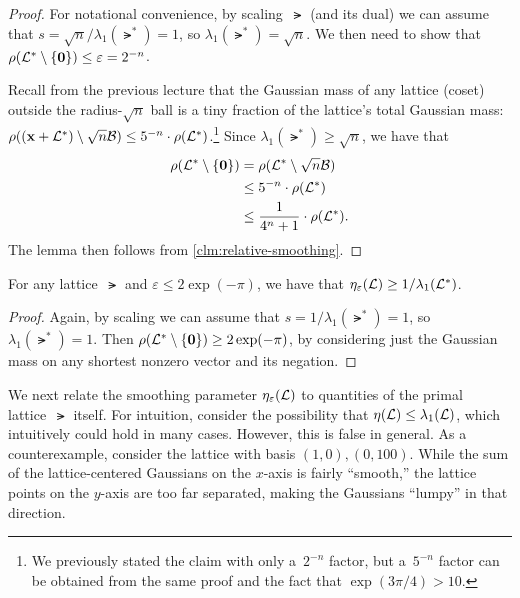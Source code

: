 \documentclass[11pt]{article}
\begin{document}
\begin{proof}
  For notational convenience, by scaling~$\lat$ (and its dual) we can
  assume that $s = \sqrt{n}/\lambda_{1}(\lat^{*}) = 1$, so
  $\lambda_{1}(\lat^{*}) = \sqrt{n}$. We then need to show that
  $\rho(\mathcal{L}^* \setminus \{\mathbf{0}\}) \leq \varepsilon = 2^{-n}$.

  Recall from the previous lecture that the Gaussian mass of any
  lattice (coset) outside the radius-$\sqrt{n}$ ball is a tiny
  fraction of the lattice's total Gaussian mass:
  $\rho((\mathbf{x}+\mathcal{L}^*) \setminus \sqrt{n}\mathcal{B}) \leq 5^{-n} \cdot
  \rho(\mathcal{L}^*)$.\footnote{We previously stated the claim with only
    a~$2^{-n}$ factor, but a~$5^{-n}$ factor can be obtained from the
    same proof and the fact that $\exp(3 \pi/4) > 10$.} Since
  $\lambda_1(\lat^*) \geq \sqrt{n}$, we have that
  \begin{align*}
    \rho(\mathcal{L}^{*} \setminus \{\mathbf{0}\})
    &= \rho(\mathcal{L}^{*} \setminus \sqrt{n} \mathcal{B}) \\
    &\leq 5^{-n} \cdot \rho(\mathcal{L}^{*}) \\
    &\leq \frac{1}{4^{n}+1} \cdot \rho(\mathcal{L}^{*}).
  \end{align*}
  The lemma then follows from \cref{clm:relative-smoothing}.
\end{proof}

\begin{lemma}
  \label{lem:smoothing-lower}
  For any lattice~$\lat$ and $\varepsilon \leq 2\exp(-\pi)$, we have
  that $\eta_\varepsilon(\mathcal{L}) \geq 1/\lambda_1(\mathcal{L}^*)$.
\end{lemma}

\begin{proof}
  Again, by scaling we can assume that $s = 1/\lambda_1(\lat^*) = 1$,
  so $\lambda_{1}(\lat^{*}) = 1$. Then
  $\rho(\mathcal{L}^* \setminus \{\mathbf{0}\}) \geq 2 \exp(-\pi)$, by
  considering just the Gaussian mass on any shortest nonzero vector
  and its negation.
\end{proof}

We next relate the smoothing parameter $\eta_{\varepsilon}(\mathcal{L})$
to quantities of the primal lattice~$\lat$ itself. For intuition,
consider the possibility that $\eta(\mathcal{L}) \leq \lambda_1(\mathcal{L})$,
which intuitively could hold in many cases. However, this is false in
general. As a counterexample, consider the lattice with basis
$(1,0), (0,100)$. While the sum of the lattice-centered Gaussians on
the $x$-axis is fairly ``smooth,'' the lattice points on the $y$-axis
are too far separated, making the Gaussians ``lumpy'' in that
direction.
\end{document}
